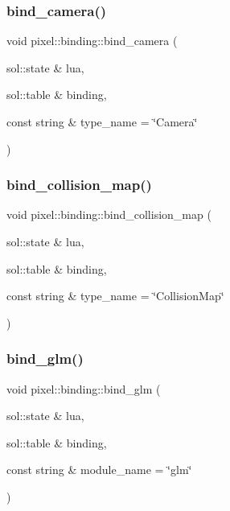 \mbox{\label{namespacepixel_1_1binding_a5229f3770ff8aa6b35955c6ec565fd23}} 
\subsubsection{\texorpdfstring{bind\+\_\+camera()}{bind\_camera()}}
{\footnotesize\ttfamily void pixel\+::binding\+::bind\+\_\+camera (\begin{DoxyParamCaption}\item[{sol\+::state \&}]{lua,  }\item[{sol\+::table \&}]{binding,  }\item[{const string \&}]{type\+\_\+name = {\ttfamily \char`\"{}Camera\char`\"{}} }\end{DoxyParamCaption})}

\mbox{\label{namespacepixel_1_1binding_a8cd7af28e7ef023bdc6d2868961e9614}} 
\subsubsection{\texorpdfstring{bind\+\_\+collision\+\_\+map()}{bind\_collision\_map()}}
{\footnotesize\ttfamily void pixel\+::binding\+::bind\+\_\+collision\+\_\+map (\begin{DoxyParamCaption}\item[{sol\+::state \&}]{lua,  }\item[{sol\+::table \&}]{binding,  }\item[{const string \&}]{type\+\_\+name = {\ttfamily \char`\"{}CollisionMap\char`\"{}} }\end{DoxyParamCaption})}

\mbox{\label{namespacepixel_1_1binding_a2a97de4cd72e526976d52014036bb423}} 
\subsubsection{\texorpdfstring{bind\+\_\+glm()}{bind\_glm()}}
{\footnotesize\ttfamily void pixel\+::binding\+::bind\+\_\+glm (\begin{DoxyParamCaption}\item[{sol\+::state \&}]{lua,  }\item[{sol\+::table \&}]{binding,  }\item[{const string \&}]{module\+\_\+name = {\ttfamily \char`\"{}glm\char`\"{}} }\end{DoxyParamCaption})}

